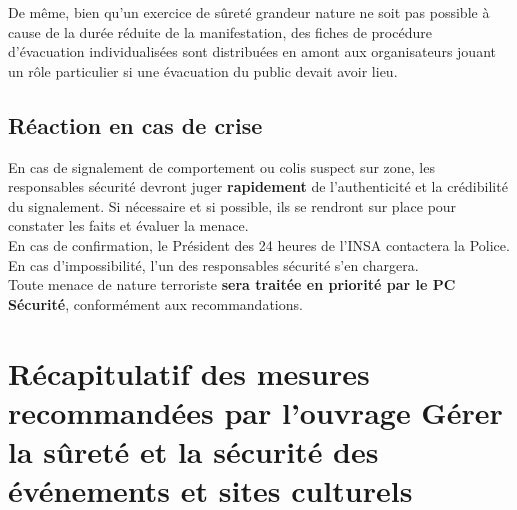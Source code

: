 \documentclass[hidelinks, paper=a4, fontsize=13pt]{report}
\begin{document}
De même, bien qu'un exercice de sûreté grandeur nature ne soit pas possible à cause de la durée réduite de la manifestation, des fiches de procédure d'évacuation individualisées sont distribuées en amont aux organisateurs jouant un rôle particulier si une évacuation du public devait avoir lieu.

\subsection{Réaction en cas de crise}
En cas de signalement de comportement ou colis suspect sur zone, les responsables sécurité devront juger \textbf{rapidement} de l’authenticité et la crédibilité du signalement. Si nécessaire et si possible, ils se rendront sur place pour constater les faits et évaluer la menace.\\
En cas de confirmation, le Président des 24 heures de l'INSA contactera la Police. En cas d’impossibilité, l'un des responsables sécurité s’en chargera.\\

Toute menace de nature terroriste \textbf{sera traitée en priorité par le PC Sécurité}, conformément aux recommandations.

\section{Récapitulatif des mesures recommandées par l'ouvrage \og Gérer la sûreté et la sécurité des événements et sites culturels \fg}
\end{document}
